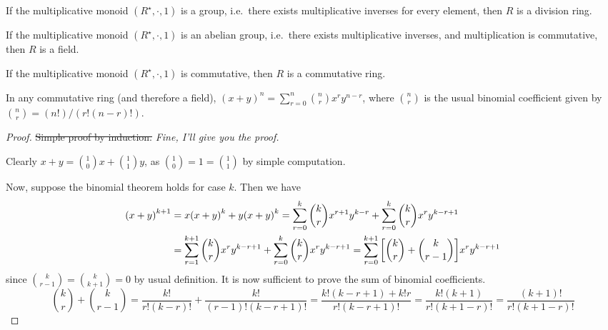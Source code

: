 \begin{definition}
    If the multiplicative monoid \((R^\star,\cdot,1)\) is a group,
    i.e.\ there exists multiplicative inverses for every element,
    then \(R\) is a division ring.
\end{definition}
\begin{definition}
    If the multiplicative monoid \((R^\star,\cdot,1)\) is an abelian group,
    i.e.\ there exists multiplicative inverses,
    and multiplication is commutative,
    then \(R\) is a field.
\end{definition}
\begin{definition}
    If the multiplicative monoid \((R^\star,\cdot,1)\) is commutative,
    then \(R\) is a commutative ring.
\end{definition}
\begin{proposition}\label{prop:binom}
    In any commutative ring (and therefore a field),
    \({(x+y)}^n = \sum_{r=0}^n \binom{n}{r} x^r y^{n-r}\),
    where \(\binom{n}{r}\) is the usual binomial coefficient
    given by \(\binom{n}{r} = (n!)/(r!(n-r)!)\).
\end{proposition}
\begin{proof}
    \sout{Simple proof by induction.}
    \textit{Fine, I'll give you the proof.}

    Clearly \(x+y = \binom{1}{0}x + \binom{1}{1}y\),
    as \(\binom{1}{0} = 1 = \binom{1}{1}\) by simple computation.

    Now, suppose the binomial theorem holds for case \(k\).
    Then we have
    \begin{align*}
        {(x+y)}^{k+1} &= x{(x+y)}^k + y{(x+y)}^k
        = \sum_{r=0}^k \binom{k}{r} x^{r+1} y^{k-r}
        + \sum_{r=0}^k \binom{k}{r} x^r y^{k-r+1} \\
        &= \sum_{r=1}^{k+1} \binom{k}{r} x^r y^{k-r+1}
        + \sum_{r=0}^k \binom{k}{r} x^r y^{k-r+1}
        = \sum_{r=0}^{k+1} \qty[\binom{k}{r}+\binom{k}{r-1}]x^r y^{k-r+1}
    \end{align*}
    since \(\binom{k}{r-1} = \binom{k}{k+1} = 0\) by usual definition.
    It is now sufficient to prove the sum of binomial coefficients.
    \begin{equation*}
        \binom{k}{r}+\binom{k}{r-1}
        = \frac{k!}{r!(k-r)!} + \frac{k!}{(r-1)!(k-r+1)!}
        = \frac{k!(k-r+1) + k!r}{r!(k-r+1)!}
        = \frac{k!(k+1)}{r!(k+1-r)!}
        = \frac{(k+1)!}{r!(k+1-r)!}
    \end{equation*}
\end{proof}

